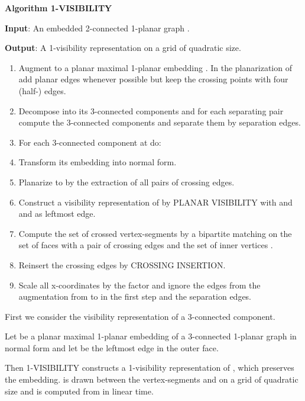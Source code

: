 \documentclass[runningheads]{llncs}
\begin{document}
\iffalse



\textbf{Algorithm  1-VISIBILITY}

\textbf{Input}: An embedded 2-connected 1-planar graph
.

\textbf{Output}: A 1-visibility representation  on
a grid of quadratic size.

\begin{enumerate}
  \item Augment  to a planar maximal 1-planar embedding .
  In the planarization of  add planar edges
  whenever possible but keep the crossing points with four
  (half-) edges.
  \item Decompose  into its 3-connected components and for each
   separating pair  compute the 3-connected components
   and separate them by separation edges.
  \item For each 3-connected component  at   do:
      \item Transform its embedding  into normal
      form.
  \item Planarize   to  
  by the extraction of  all pairs of crossing  edges.
  \item Construct a visibility representation of 
  by PLANAR VISIBILITY with  and  and  as
  leftmost edge.
  \item Compute the set of crossed vertex-segments by a
  bipartite matching on the set of faces with a pair of crossing
  edges  and the set of inner vertices .
  \item Reinsert the crossing edges by CROSSING INSERTION.
  \item Scale all x-coordinates by the factor  and ignore the edges from the augmentation
  from  to  in the first step and the separation edges.
\end{enumerate}




First we consider the visibility representation of a 3-connected
component.

\begin{theorem}
Let  be a planar maximal 1-planar embedding of a
3-connected 1-planar graph   in normal form and let  be
the leftmost edge in the outer face.

Then 1-VISIBILITY constructs a 1-visibility representation
 of , which preserves the embedding.
 is drawn between the vertex-segments 
and  on a grid of quadratic size and is computed from
 in linear time.
\end{theorem}
\end{document}
